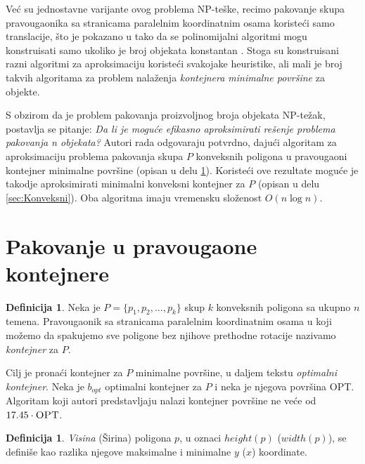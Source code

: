 \documentclass[a4paper]{article}
\theoremstyle{plain}
\theoremstyle{definition}
\newtheorem{defn}[thm]{Definicija} %
\begin{document}
Ve\'c{} su jednostavne varijante ovog problema NP-te\v{s}ke, recimo pakovanje skupa pravougaonika sa stranicama paralelnim koordinatnim osama koriste\'c{}i samo translacije, \v{s}to je pokazano u \cite{OptimalPackingInPlane} tako da se polinomijalni algoritmi mogu konstruisati samo ukoliko je broj objekata konstantan \cite{BuildingThreeConvexPolygons, AligningTwoConvexFigures}. Stoga su konstruisani razni algoritmi za aproksimaciju koriste\'c{}i svakojake heuristike, ali mali je broj takvih algoritama za problem nala\v{z}enja \emph{kontejnera minimalne povr\v{s}ine} za objekte. 

S obzirom da je problem pakovanja proizvoljnog broja objekata NP-te\v{z}ak, postavlja se pitanje: \emph{Da li je mogu\'c{}e efikasno aproksimirati re\v{s}enje problema pakovanja n objekata?} Autori rada odgovaraju potvrdno, daju\'c{}i algoritam za aproksimaciju problema pakovanja skupa $P$ konveksnih poligona u pravougaoni kontejner minimalne povr\v{s}ine (opisan u delu \ref{sec:Pravougaoni}). Koriste\'c{}i ove rezultate mogu\'c{}e je takodje aproksimirati minimalni konveksni kontejner za $P$ (opisan u delu \ref{sec:Konveksni}). Oba algoritma imaju vremensku slo\v{z}enost $O(n\log{}n)$.


\section{Pakovanje u pravougaone kontejnere}
\label{sec:Pravougaoni}

\begin{defn}
    Neka je $P = \{ p_{1}, p_{2}, ... , p_{k} \}$ skup $k$ konveksnih poligona sa ukupno $n$ temena. Pravougaonik sa stranicama paralelnim koordinatnim osama u koji mo\v{z}emo da spakujemo sve poligone bez njihove prethodne rotacije nazivamo \emph{kontejner} za $P$.
\end{defn}

Cilj je prona\'c{}i kontejner za $P$ minimalne povr\v{s}ine, u daljem tekstu \emph{optimalni kontejner}. Neka je $b_{opt}$ optimalni kontejner za $P$ i neka je njegova povr\v{s}ina \textsc{OPT}. Algoritam koji autori predstavljaju nalazi kontejner povr\v{s}ine ne ve\'c{}e od $17.45 \cdot \textsc{OPT}$.

\begin{defn}
    \emph{Visina} (\v{Sirina}) poligona $p$, u oznaci \emph{$height(p)$} (\emph{$width(p)$}), se defini\v{s}e kao razlika njegove maksimalne i minimalne $y$ ($x$) koordinate.
\end{defn}
\end{document}
